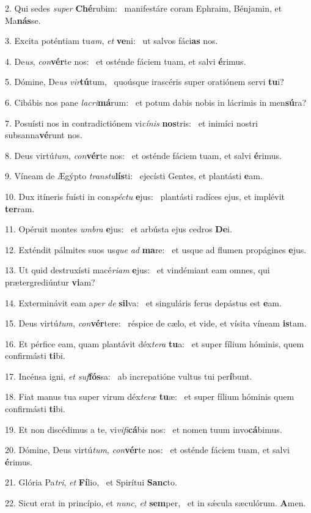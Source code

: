 2. Qui sedes \textit{su}\textit{per} \textbf{Ché}rubim: \ast\  manifestáre coram Ephraim, Bénjamin, et Ma\textbf{nás}se.\

3. Excita poténtiam tu\textit{am}, \textit{et} \textbf{ve}ni: \ast\  ut salvos fáci\textbf{as} nos.\

4. De\textit{us}, \textit{con}\textbf{vér}te nos: \ast\  et osténde fáciem tuam, et salvi \textbf{é}rimus.\

5. Dómine, De\textit{us} \textit{vir}\textbf{tú}tum, \ast\  quoúsque irascéris super oratiónem servi \textbf{tu}i?\

6. Cibábis nos pane \textit{la}\textit{cri}\textbf{má}rum: \ast\  et potum dabis nobis in lácrimis in men\textbf{sú}ra?\

7. Posuísti nos in contradictiónem vi\textit{cí}\textit{nis} \textbf{nos}tris: \ast\  et inimíci nostri subsanna\textbf{vé}runt nos.\

8. Deus virtú\textit{tum}, \textit{con}\textbf{vér}te nos: \ast\  et osténde fáciem tuam, et salvi \textbf{é}rimus.\

9. Víneam de Ægýpto \textit{trans}\textit{tu}\textbf{lís}ti: \ast\  ejecísti Gentes, et plantásti \textbf{e}am.\

10. Dux itíneris fuísti in con\textit{spéc}\textit{tu} \textbf{e}jus: \ast\  plantásti radíces ejus, et implévit \textbf{ter}ram.\

11. Opéruit montes \textit{um}\textit{bra} \textbf{e}jus: \ast\  et arbústa ejus cedros \textbf{De}i.\

12. Exténdit pálmites suos us\textit{que} \textit{ad} \textbf{ma}re: \ast\  et usque ad flumen propágines \textbf{e}jus.\

13. Ut quid destruxísti macé\textit{ri}\textit{am} \textbf{e}jus: \ast\  et vindémiant eam omnes, qui prætergrediúntur \textbf{vi}am?\

14. Exterminávit eam a\textit{per} \textit{de} \textbf{sil}va: \ast\  et singuláris ferus depástus est \textbf{e}am.\

15. Deus virtú\textit{tum}, \textit{con}\textbf{vér}tere: \ast\  réspice de cælo, et vide, et vísita víneam \textbf{is}tam.\

16. Et pérfice eam, quam plantávit déx\textit{te}\textit{ra} \textbf{tu}a: \ast\  et super fílium hóminis, quem confirmásti \textbf{ti}bi.\

17. Incénsa igni, \textit{et} \textit{suf}\textbf{fós}sa: \ast\  ab increpatióne vultus tui per\textbf{í}bunt.\

18. Fiat manus tua super virum déx\textit{te}\textit{ræ} \textbf{tu}æ: \ast\  et super fílium hóminis quem confirmásti \textbf{ti}bi.\

19. Et non discédimus a te, vi\textit{vi}\textit{fi}\textbf{cá}bis nos: \ast\  et nomen tuum invo\textbf{cá}bimus.\

20. Dómine, Deus virtú\textit{tum}, \textit{con}\textbf{vér}te nos: \ast\  et osténde fáciem tuam, et salvi \textbf{é}rimus.\

21. Glória Pa\textit{tri}, \textit{et} \textbf{Fí}lio, \ast\  et Spirítui \textbf{Sanc}to.\

22. Sicut erat in princípio, et \textit{nunc}, \textit{et} \textbf{sem}per, \ast\  et in sǽcula sæculórum. \textbf{A}men.\

